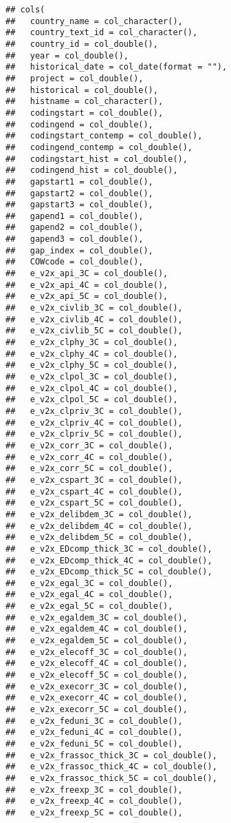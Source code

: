 \documentclass[
]{article}
\begin{document}
\begin{verbatim}
## cols(
##   country_name = col_character(),
##   country_text_id = col_character(),
##   country_id = col_double(),
##   year = col_double(),
##   historical_date = col_date(format = ""),
##   project = col_double(),
##   historical = col_double(),
##   histname = col_character(),
##   codingstart = col_double(),
##   codingend = col_double(),
##   codingstart_contemp = col_double(),
##   codingend_contemp = col_double(),
##   codingstart_hist = col_double(),
##   codingend_hist = col_double(),
##   gapstart1 = col_double(),
##   gapstart2 = col_double(),
##   gapstart3 = col_double(),
##   gapend1 = col_double(),
##   gapend2 = col_double(),
##   gapend3 = col_double(),
##   gap_index = col_double(),
##   COWcode = col_double(),
##   e_v2x_api_3C = col_double(),
##   e_v2x_api_4C = col_double(),
##   e_v2x_api_5C = col_double(),
##   e_v2x_civlib_3C = col_double(),
##   e_v2x_civlib_4C = col_double(),
##   e_v2x_civlib_5C = col_double(),
##   e_v2x_clphy_3C = col_double(),
##   e_v2x_clphy_4C = col_double(),
##   e_v2x_clphy_5C = col_double(),
##   e_v2x_clpol_3C = col_double(),
##   e_v2x_clpol_4C = col_double(),
##   e_v2x_clpol_5C = col_double(),
##   e_v2x_clpriv_3C = col_double(),
##   e_v2x_clpriv_4C = col_double(),
##   e_v2x_clpriv_5C = col_double(),
##   e_v2x_corr_3C = col_double(),
##   e_v2x_corr_4C = col_double(),
##   e_v2x_corr_5C = col_double(),
##   e_v2x_cspart_3C = col_double(),
##   e_v2x_cspart_4C = col_double(),
##   e_v2x_cspart_5C = col_double(),
##   e_v2x_delibdem_3C = col_double(),
##   e_v2x_delibdem_4C = col_double(),
##   e_v2x_delibdem_5C = col_double(),
##   e_v2x_EDcomp_thick_3C = col_double(),
##   e_v2x_EDcomp_thick_4C = col_double(),
##   e_v2x_EDcomp_thick_5C = col_double(),
##   e_v2x_egal_3C = col_double(),
##   e_v2x_egal_4C = col_double(),
##   e_v2x_egal_5C = col_double(),
##   e_v2x_egaldem_3C = col_double(),
##   e_v2x_egaldem_4C = col_double(),
##   e_v2x_egaldem_5C = col_double(),
##   e_v2x_elecoff_3C = col_double(),
##   e_v2x_elecoff_4C = col_double(),
##   e_v2x_elecoff_5C = col_double(),
##   e_v2x_execorr_3C = col_double(),
##   e_v2x_execorr_4C = col_double(),
##   e_v2x_execorr_5C = col_double(),
##   e_v2x_feduni_3C = col_double(),
##   e_v2x_feduni_4C = col_double(),
##   e_v2x_feduni_5C = col_double(),
##   e_v2x_frassoc_thick_3C = col_double(),
##   e_v2x_frassoc_thick_4C = col_double(),
##   e_v2x_frassoc_thick_5C = col_double(),
##   e_v2x_freexp_3C = col_double(),
##   e_v2x_freexp_4C = col_double(),
##   e_v2x_freexp_5C = col_double(),

\end{verbatim}
\end{document}
